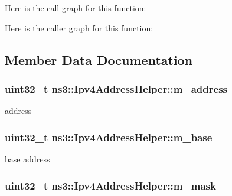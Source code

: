 Here is the call graph for this function\+:




Here is the caller graph for this function\+:




\subsection{Member Data Documentation}
\subsubsection[{\texorpdfstring{m\+\_\+address}{m_address}}]{\setlength{\rightskip}{0pt plus 5cm}uint32\+\_\+t ns3\+::\+Ipv4\+Address\+Helper\+::m\+\_\+address\hspace{0.3cm}{\ttfamily [private]}}\hypertarget{classns3_1_1Ipv4AddressHelper_aa68736c00c771186f9bc5add68c791b1}{}\label{classns3_1_1Ipv4AddressHelper_aa68736c00c771186f9bc5add68c791b1}


address 

\subsubsection[{\texorpdfstring{m\+\_\+base}{m_base}}]{\setlength{\rightskip}{0pt plus 5cm}uint32\+\_\+t ns3\+::\+Ipv4\+Address\+Helper\+::m\+\_\+base\hspace{0.3cm}{\ttfamily [private]}}\hypertarget{classns3_1_1Ipv4AddressHelper_a6cc73c3a86586b6432114d1de1bcf485}{}\label{classns3_1_1Ipv4AddressHelper_a6cc73c3a86586b6432114d1de1bcf485}


base address 

\subsubsection[{\texorpdfstring{m\+\_\+mask}{m_mask}}]{\setlength{\rightskip}{0pt plus 5cm}uint32\+\_\+t ns3\+::\+Ipv4\+Address\+Helper\+::m\+\_\+mask\hspace{0.3cm}{\ttfamily [private]}}\hypertarget{classns3_1_1Ipv4AddressHelper_a1609535faf34e2010483660d881fe29e}{}\label{classns3_1_1Ipv4AddressHelper_a1609535faf34e2010483660d881fe29e}


